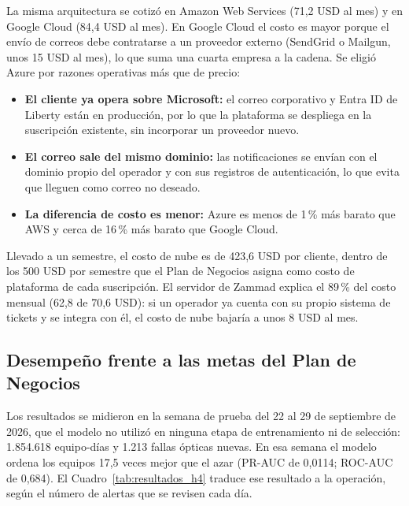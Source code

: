 \documentclass[12pt,a4paper]{article}
\begin{document}
\noindent
La misma arquitectura se cotizó en Amazon Web Services (71,2 USD al mes) y en Google Cloud (84,4 USD al mes). En Google Cloud el costo es mayor porque el envío de correos debe contratarse a un proveedor externo (SendGrid o Mailgun, unos 15 USD al mes), lo que suma una cuarta empresa a la cadena. Se eligió Azure por razones operativas más que de precio:
\begin{itemize}
    \item \textbf{El cliente ya opera sobre Microsoft:} el correo corporativo y Entra ID de Liberty están en producción, por lo que la plataforma se despliega en la suscripción existente, sin incorporar un proveedor nuevo.
    \item \textbf{El correo sale del mismo dominio:} las notificaciones se envían con el dominio propio del operador y con sus registros de autenticación, lo que evita que lleguen como correo no deseado.
    \item \textbf{La diferencia de costo es menor:} Azure es menos de 1\,\% más barato que AWS y cerca de 16\,\% más barato que Google Cloud.
\end{itemize}

\noindent
Llevado a un semestre, el costo de nube es de 423,6 USD por cliente, dentro de los 500 USD por semestre que el Plan de Negocios asigna como costo de plataforma de cada suscripción. El servidor de Zammad explica el 89\,\% del costo mensual (62,8 de 70,6 USD): si un operador ya cuenta con su propio sistema de tickets y se integra con él, el costo de nube bajaría a unos 8 USD al mes.

\subsection{Desempeño frente a las metas del Plan de Negocios}
\label{subsec:metas}
\noindent
Los resultados se midieron en la semana de prueba del 22 al 29 de septiembre de 2026, que el modelo no utilizó en ninguna etapa de entrenamiento ni de selección: 1.854.618 equipo-días y 1.213 fallas ópticas nuevas. En esa semana el modelo ordena los equipos 17,5 veces mejor que el azar (PR-AUC de 0,0114; ROC-AUC de 0,684). El Cuadro~\ref{tab:resultados_h4} traduce ese resultado a la operación, según el número de alertas que se revisen cada día.
\end{document}
